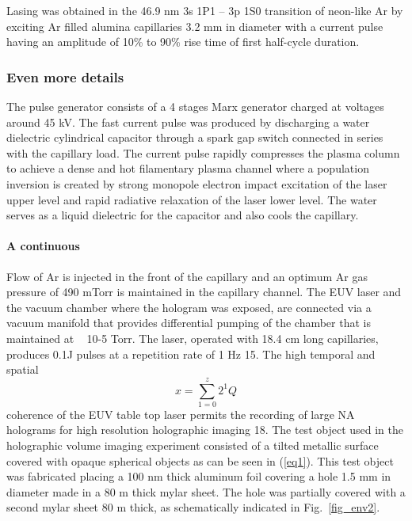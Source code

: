 \documentclass[]{IEEEphot}
\begin{document}
 Lasing was obtained in the 46.9 nm 3s 1P1 – 3p 1S0  transition of neon-like Ar by exciting Ar filled alumina capillaries 3.2 mm in diameter with a current pulse having an amplitude of 10\% to 90\% rise time of first half-cycle duration.  

\subsubsection{Even more details}

 The pulse generator consists of a 4 stages Marx generator charged at voltages around 45 kV. The fast current pulse was produced by discharging a water dielectric cylindrical capacitor through a spark gap switch connected in series with the capillary load. The current pulse rapidly compresses the plasma column to achieve a dense and hot filamentary plasma channel where a population inversion is created by strong monopole electron impact excitation of the laser upper level and rapid radiative relaxation of the laser lower level. The water serves as a liquid dielectric for the capacitor and also cools the capillary.  


\paragraph{A continuous} Flow of Ar is injected in the front of the capillary and an optimum Ar gas pressure of 490 mTorr is maintained in the capillary channel. The EUV laser and the vacuum chamber where the hologram was exposed, are connected via a vacuum manifold that provides differential pumping of the chamber that is maintained at ~ 10-5 Torr. The laser, operated with 18.4 cm long capillaries, produces 0.1J pulses at a repetition rate of 1 Hz 15. The high temporal and spatial  
\begin{equation}
x=\sum\limits_{1=0}^z 2^1Q
\label{eq1}
\end{equation}%
coherence of the EUV table top laser permits the recording of large NA holograms for high resolution holographic imaging 18. The test object used in the holographic volume imaging experiment consisted of a tilted metallic surface covered with opaque spherical objects as can be seen in (\ref{eq1}). This test object was fabricated placing a 100 nm thick aluminum foil covering a hole 1.5 mm in diameter made in a 80 m thick mylar sheet. The hole was partially covered with a second mylar sheet 80 m thick, as schematically indicated in Fig.~\ref{fig_env2}.
\end{document}
